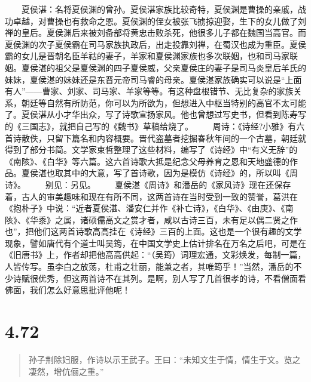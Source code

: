 \documentclass[]{book}
\begin{document}
　　夏侯湛：名将夏侯渊的曾孙。夏侯湛家族比较奇特，夏侯渊是曹操的亲戚，战功卓越，对曹操也有救命之恩。夏侯渊的侄女被张飞掳掠迎娶，生下的女儿做了刘禅的皇后。夏侯渊后来被刘备部将黄忠击败杀死，他很多儿子都在魏国当高官。而夏侯渊的次子夏侯霸在司马家族执政后，出走投靠刘禅，在蜀汉也成为重臣。夏侯霸的女儿是晋朝名臣羊祜的妻子，羊家和夏侯渊家族也多次联姻，也和司马家联姻。夏侯湛的祖父是夏侯渊的四子夏侯威，父亲夏侯庄的妻子是司马炎皇后羊氏的妹妹，夏侯湛的妹妹还是东晋元帝司马睿的母亲。夏侯湛家族确实可以说是``上面有人''------曹家、刘家、司马家、羊家等等。有这种盘根错节、无比复杂的家族关系，朝廷等自然有所防范，你可以为所欲为，但想进入中枢当特别的高官不太可能了。夏侯湛从小才华出众，写了诗歌宣扬家风。他也曾想过写史书，但看到陈寿写的《三国志》，就把自己写的《魏书》草稿给烧了。
　　周诗：《诗经?小雅》有六首诗散佚，只留下篇名和内容概要。晋代盗墓者挖掘春秋年间的一个古墓，朝廷就得到了部分书简。文学家束皙整理了这些材料，编写了《诗经》中``有义无辞''的《南陔》、《白华》等六篇。这六首诗歌大抵是纪念父母养育之恩和天地盛德的作品。夏侯湛也取其中的大意，写了首诗歌，因为是模仿《诗经》的，所以叫《周诗》。
　　别见：另见。
　　夏侯湛《周诗》和潘岳的《家风诗》现在还保存着，古人的审美趣味和现在有所不同，这两首诗在当时受到一致的赞誉，葛洪在《抱朴子》中说：``近者夏侯湛、潘安仁并作《补亡诗》，《白华》、《由庚》、《南陔》、《华黍》之属，诸硕儒高文之赏才者，咸以古诗三百，未有足以偶二贤之作也''，把他们这两首诗歌高高挂在《诗经》三百的上面。这也是一个很有趣的文学现象，譬如唐代有个道士叫吴筠，在中国文学史上估计排名在万名之后吧，可是在《旧唐书》上，作者却把他高高供起：``（吴筠）词理宏通，文彩焕发，每制一篇，人皆传写。虽李白之放荡，杜甫之壮丽，能兼之者，其唯筠乎！''当然，潘岳的不少诗赋很优秀，但这两首诗不在其列。是啊，别人写了几首很孝的诗，不看僧面看佛面，我们怎么好意思批评他呢！

\section{4.72}\label{section-249}

\begin{quote}
孙子荆除妇服，作诗以示王武子。王曰：``未知文生于情，情生于文。览之凄然，增伉俪之重。''
\end{quote}
\end{document}
